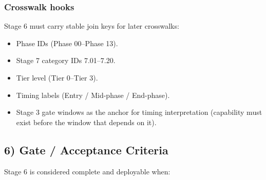\documentclass[10pt]{article}
\begin{document}
\subsubsection*{Crosswalk hooks}

Stage 6 must carry stable join keys for later crosswalks:

\begin{itemize}
\item Phase IDs (Phase 00–Phase 13).
\item Stage 7 category IDs 7.01–7.20.
\item Tier level (Tier 0–Tier 3).
\item Timing labels (Entry / Mid-phase / End-phase).
\item Stage 3 gate windows as the anchor for timing interpretation (capability must exist before the window that depends on it).
\end{itemize}

\subsection*{6) Gate / Acceptance Criteria}

Stage 6 is considered complete and deployable when:
\end{document}
